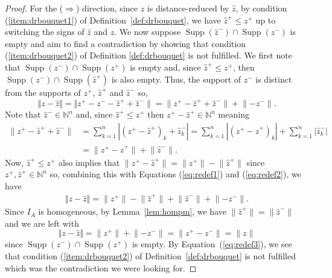 \documentclass[10pt,a4paper]{amsart}
\newcommand{\NN}{\mathbb N}
\begin{document}
\begin{proof}
    For the ($\Rightarrow$) direction, since $z$ is distance-reduced by $\hat z$, by condition (\ref{item:drbouquet1}) of Definition~\ref{def:drbouquet}, we have $\hat z^+ \le z^+$ up to switching the signs of $\hat z$ and $z$. We now suppose $\operatorname{Supp}(\hat z^{-}) \cap \operatorname{Supp}(z^{-})$ is empty and aim to find a contradiction by showing that condition (\ref{item:drbouquet2}) of Definition \ref{def:drbouquet} is not fulfilled. We first note that $\operatorname{Supp}(z^{-}) \cap \operatorname{Supp}(z^{+})$ is empty and, since $\hat z^{+} \le z^{+}$, then $\operatorname{Supp}(z^{-}) \cap \operatorname{Supp}(\hat z^{+})$ is also empty. Thus, the support of $z^{-}$ is distinct from the supports of $z^{+}$, $\hat z^{+}$ and $\hat z^{-}$ so,
\begin{equation}\label{eq:redef1}
 \Vert z - \hat z \Vert =\Vert  z^{+} - z^{-} -  \hat z^{+} + \hat z^{-} \rVert
        =\lVert  z^{+} -  \hat z^{+} + \hat z^{-}\rVert + \lVert - z^{-}\rVert.
\end{equation}
Note that $\hat z^{-} \in \NN^n$ and, since $\hat z^{+} \le z^{+}$ then $z^{+}-\hat z^{+} \in \NN^n$ meaning 
\begin{align}\label{eq:redef2}
 \lVert  z^{+} -  \hat z^{+} + \hat z^{-}\rVert&=\sum_{k=1}^n |(z^{+} -  \hat z^{+})_k + \hat z_k^{-}|=\sum_{k=1}^n |(z^{+} -  \hat z^{+})_k | + \sum_{k=1}^n|\hat z_k^{-}|\\ \nonumber
 &=\lVert  z^{+} -  \hat z^{+} \rVert + \lVert \hat z^{-}\rVert.
\end{align}
    Now, $\hat z^{+} \le z^{+}$ also implies that $\lVert z^{+} - \hat z^{+} \rVert = \lVert z^{+} \rVert - \lVert \hat z^{+} \rVert$ since $z^+,\hat z^+ \in \NN^n$ so, combining this with Equations (\ref{eq:redef1}) and (\ref{eq:redef2}), we have
    \begin{align*}
        \Vert z - \hat z \Vert=\lVert  z^{+} \rVert -  \lVert \hat z^{+} \rVert +  \lVert\hat z^{-}\rVert + \lVert - z^{-}\rVert.
    \end{align*}
    Since $I_A$ is homogeneous, by Lemma~\ref{lem:hompm}, we have $\lVert \hat z^+ \rVert = \lVert \hat z^- \rVert$ and we are left with
    \begin{equation} \label{eq:redef3}
        \Vert z - \hat z \Vert=\lVert  z^{+} \rVert+\lVert - z^{-}\rVert=\lVert  z^{+} - z^{-}\rVert=\lVert z \rVert
    \end{equation}
    since $\operatorname{Supp}(z^{-}) \cap \operatorname{Supp}(z^{+})$ is empty. By Equation~(\ref{eq:redef3}), we see that condition (\ref{item:drbouquet2}) of Definition~\ref{def:drbouquet} is not fulfilled which was the contradiction we were looking for.


\end{proof}
\end{document}
